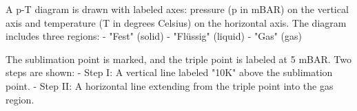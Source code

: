 A p-T diagram is drawn with labeled axes: pressure (p in mBAR) on the vertical axis and temperature (T in degrees Celsius) on the horizontal axis.  
The diagram includes three regions:  
- "Fest" (solid)  
- "Flüssig" (liquid)  
- "Gas" (gas)  

The sublimation point is marked, and the triple point is labeled at 5 mBAR.  
Two steps are shown:  
- Step I: A vertical line labeled "10K" above the sublimation point.  
- Step II: A horizontal line extending from the triple point into the gas region.